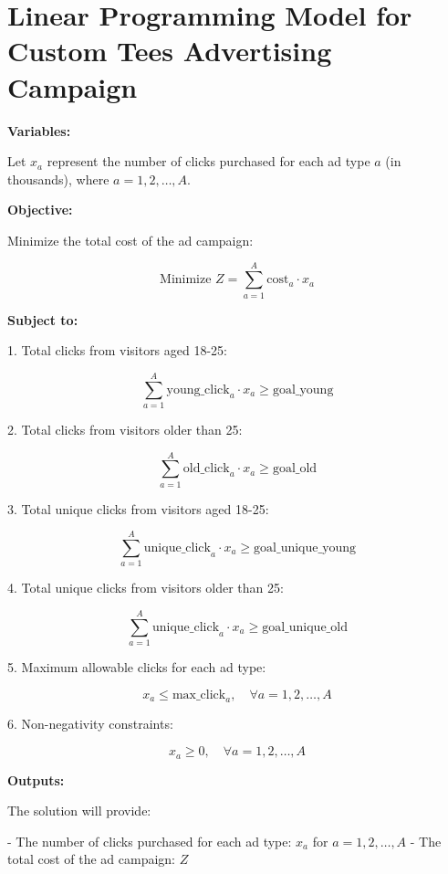 \documentclass{article}
\begin{document}
\section*{Linear Programming Model for Custom Tees Advertising Campaign}

\textbf{Variables:}

Let \( x_a \) represent the number of clicks purchased for each ad type \( a \) (in thousands), where \( a = 1, 2, \ldots, A \).

\textbf{Objective:}

Minimize the total cost of the ad campaign:

\[
\text{Minimize } Z = \sum_{a=1}^{A} \text{cost}_a \cdot x_a
\]

\textbf{Subject to:}

1. Total clicks from visitors aged 18-25:

\[
\sum_{a=1}^{A} \text{young\_click}_{a} \cdot x_a \geq \text{goal\_young}
\]

2. Total clicks from visitors older than 25:

\[
\sum_{a=1}^{A} \text{old\_click}_{a} \cdot x_a \geq \text{goal\_old}
\]

3. Total unique clicks from visitors aged 18-25:

\[
\sum_{a=1}^{A} \text{unique\_click}_{a} \cdot x_a \geq \text{goal\_unique\_young}
\]

4. Total unique clicks from visitors older than 25:

\[
\sum_{a=1}^{A} \text{unique\_click}_{a} \cdot x_a \geq \text{goal\_unique\_old}
\]

5. Maximum allowable clicks for each ad type:

\[
x_a \leq \text{max\_click}_{a}, \quad \forall a = 1, 2, \ldots, A
\]

6. Non-negativity constraints:

\[
x_a \geq 0, \quad \forall a = 1, 2, \ldots, A
\]

\textbf{Outputs:}

The solution will provide:

- The number of clicks purchased for each ad type: \( x_a \) for \( a = 1, 2, \ldots, A \)
- The total cost of the ad campaign: \( Z \)
\end{document}
